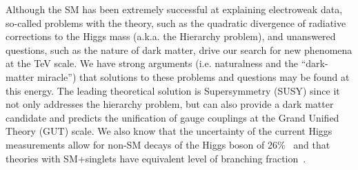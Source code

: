 

Although the SM has been extremely successful at explaining electroweak data, so-called problems with the theory, such as the quadratic divergence of radiative corrections to the Higgs mass (a.k.a. the Hierarchy problem), and unanswered questions, such as the nature of dark matter, drive our search for new phenomena at the TeV scale. We have strong arguments (i.e. naturalness and the ``dark-matter miracle'') 
that solutions to these problems and questions may be found at this energy. 
The leading theoretical solution is Supersymmetry (SUSY) since it not only addresses the hierarchy problem, but can also provide a dark matter candidate and predicts the unification of gauge couplings at the Grand Unified Theory (GUT) scale.
We also know that the uncertainty of the current Higgs measurements allow for non-SM decays of the Higgs boson of 26\%~\cite{combin} and that theories with SM+singlets have equivalent level of branching fraction~\cite{exohiggs}.




